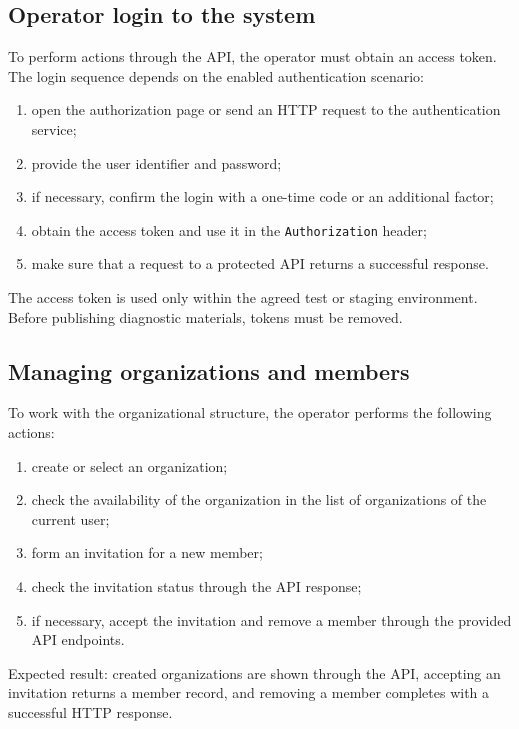 \documentclass[12pt,a4paper]{extarticle}
\begin{document}
\subsection{Operator login to the system}

\begin{hseExample}
To perform actions through the API, the operator must obtain an access token. The login sequence depends on the enabled authentication scenario:

\begin{enumerate}[label=\arabic*), leftmargin=1.25cm]
    \item open the authorization page or send an HTTP request to the authentication service;
    \item provide the user identifier and password;
    \item if necessary, confirm the login with a one-time code or an additional factor;
    \item obtain the access token and use it in the \texttt{Authorization} header;
    \item make sure that a request to a protected API returns a successful response.
\end{enumerate}

The access token is used only within the agreed test or staging environment. Before publishing diagnostic materials, tokens must be removed.
\end{hseExample}

\subsection{Managing organizations and members}

\begin{hseExample}
To work with the organizational structure, the operator performs the following actions:

\begin{enumerate}[label=\arabic*), leftmargin=1.25cm]
    \item create or select an organization;
    \item check the availability of the organization in the list of organizations of the current user;
    \item form an invitation for a new member;
    \item check the invitation status through the API response;
    \item if necessary, accept the invitation and remove a member through the provided API endpoints.
\end{enumerate}

Expected result: created organizations are shown through the API, accepting an invitation returns a member record, and removing a member completes with a successful HTTP response.
\end{hseExample}
\end{document}
